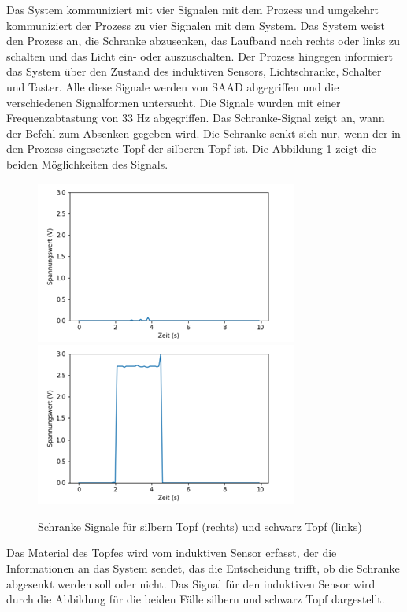 \documentclass[12pt,a4paper]{scrartcl}
\numberwithin{equation}{section}
\begin{document}
Das System kommuniziert mit vier Signalen mit dem Prozess und umgekehrt kommuniziert der Prozess zu vier Signalen mit dem System. Das System weist den Prozess an, die Schranke abzusenken, das Laufband nach rechts oder links zu schalten und das Licht ein- oder auszuschalten. Der Prozess hingegen informiert das System über den Zustand des induktiven Sensors, Lichtschranke, Schalter und Taster. Alle diese Signale werden von SAAD abgegriffen und die verschiedenen Signalformen untersucht. Die Signale wurden mit einer Frequenzabtastung von 33 Hz abgegriffen.  
Das Schranke-Signal zeigt an, wann der Befehl zum Absenken gegeben wird. Die Schranke senkt sich nur, wenn der in den Prozess eingesetzte Topf der silberen Topf ist. Die Abbildung \ref{schranke} zeigt die beiden Möglichkeiten des Signals. 

\begin{figure}[ht!]
	\centering
	  \includegraphics[scale=0.75]{schranke_black.png}
	  \includegraphics[scale=0.75]{schranke.png}
	  \caption{Schranke Signale für silbern Topf (rechts) und schwarz Topf (links)}
	  \label{schranke}
\end{figure}

Das Material des Topfes wird vom induktiven Sensor erfasst, der die Informationen an das System sendet, das die Entscheidung trifft, ob die Schranke abgesenkt werden soll oder nicht. Das Signal für den induktiven Sensor wird durch die Abbildung für die beiden Fälle silbern und schwarz Topf dargestellt. 
\end{document}
